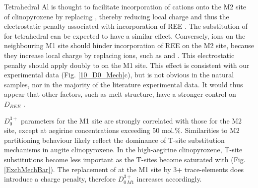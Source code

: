 \documentclass[review,authoryear,12pt]{elsarticle}
\begin{document}
	Tetrahedral Al is thought to facilitate incorporation of  cations onto the M2 site of clinopyroxene by replacing , thereby reducing local charge and thus the electrostatic penalty associated with incorporation of REE \citep{Blundy1998}.
     The substitution of  for tetrahedral  can be expected to have a similar effect. Conversely,  ions on the neighbouring M1 site should hinder incorporation of REE on the M2 site, because they increase local charge by replacing  ions, such as  and . This electrostatic penalty should apply doubly to  on the M1 site. This effect is consistent with our experimental data (Fig. \ref{10_D0_Mech}c), but is not obvious in the natural samples, nor in the majority of the literature experimental data. It would thus appear that other factors, such as melt structure, have a stronger control on $D_{REE}$ \citep[e.g.][]{Prowatke2005}.


	$D_0^{3+}$ parameters for the M1 site are strongly correlated with those for the M2 site, except at aegirine concentrations exceeding 50 mol.\%. Similarities to M2 partitioning behaviour likely reflect the dominance of T-site substitution mechanisms in augite clinopyroxene. In the high-aegirine clinopyroxene, T-site substitutions become less important as the T-sites become saturated with  (Fig. \ref{ExchMechBar}). The replacement of  at the M1 site by 3+ trace-elements does introduce a charge penalty, therefore $D_{0\, M1}^{3+}$ increases accordingly.
  




\end{document}

